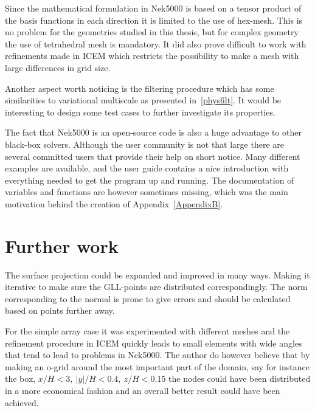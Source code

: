 Since the mathematical formulation in Nek5000 is based on a tensor product of the basis functions 
in each direction it is limited to the use of hex-mesh. This is no problem for the geometries 
studied in this thesis, but for complex geometry the use of tetrahedral mesh is mandatory.
It did also prove difficult to work with refinements made in ICEM which restricts the possibility 
to make a mesh with large differences in grid size.

Another aspect worth noticing is the filtering procedure which has some similarities to variational multiscale
as presented in~\cref{physfilt}. It would be interesting to design some test cases to further 
investigate its properties. 

The fact that Nek5000 is an open-source code is also a huge advantage to other black-box solvers. 
Although the user community is not that large there are several committed users that provide 
their help on short notice. Many different examples are available, and the user guide 
contains a nice introduction with everything needed to get the program up and running. 
The documentation of variables and functions are however sometimes missing, which was 
the main motivation behind the creation of Appendix~\ref{AppendixB}. 


\section{Further work}
The surface projection could be expanded and improved in many ways. Making it iterative 
to make sure the GLL-points are distributed correspondingly. The norm corresponding
to the normal is prone to give errors and should be calculated based on points further away.

For the simple array case it was experimented with different meshes and the refinement procedure 
in ICEM quickly leads to small elements with wide angles that tend to lead to problems 
in Nek5000. The author do however believe that by making an o-grid around the most important part of 
the domain, say for instance the box, $x/H < 3,\: |y|/H < 0.4,\: z/H < 0.15$ the nodes could have been 
distributed in a more economical fashion and an overall better result could have been achieved.

